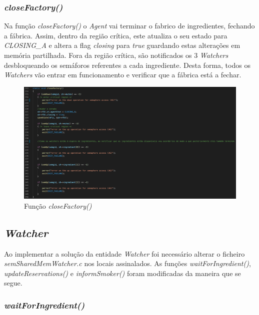 \documentclass[10pt,portuguese]{article}
\begin{document}
\clearpage

\subsubsection{\textit{closeFactory()}}

\par Na função \textit{closeFactory()} o \textit{Agent} vai terminar o fabrico de ingredientes, fechando a fábrica. Assim, dentro da região crítica, este atualiza o seu estado para \textit{CLOSING\_A} e altera a flag \textit{closing} para \textit{true} guardando estas alterações em memória partilhada. Fora da região crítica, são notificados os 3 \textit{Watchers} desbloqueando os semáforos referentes a cada ingrediente. Desta forma, todos os \textit{Watchers} vão entrar em funcionamento e verificar que a fábrica está a fechar.

\begin{figure}[!h]
    \centering
    \includegraphics[width=\textwidth]{images/implementation/closefact.png}
    \caption{Função \textit{closeFactory()}}
\end{figure}

\subsection{\textit{Watcher}}
\par Ao implementar a solução da entidade \textit{Watcher} foi necessário alterar o ficheiro \textit{semSharedMemWatcher.c} nos locais assinalados. As funções \textit{waitForIngredient()}, \textit{updateReservations()} e \textit{informSmoker()} foram modificadas da maneira que se segue.

\subsubsection{\textit{waitForIngredient()}}
\end{document}
